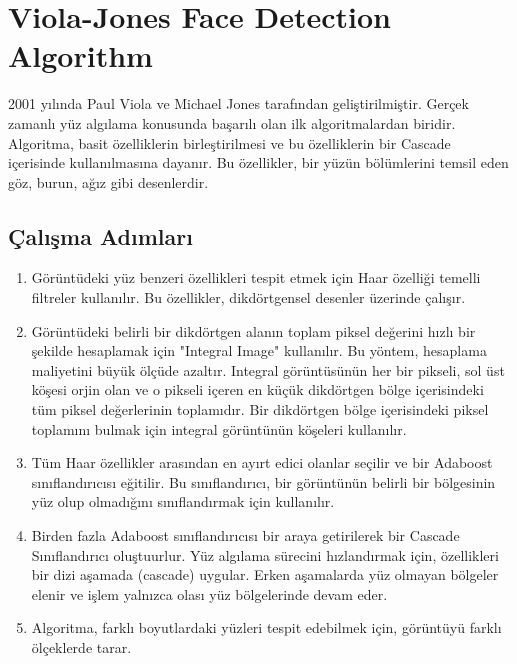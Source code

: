 \section{Viola-Jones Face Detection Algorithm}

2001 yılında Paul Viola ve Michael Jones tarafından geliştirilmiştir. Gerçek zamanlı yüz algılama konusunda başarılı olan ilk algoritmalardan biridir. Algoritma, basit özelliklerin birleştirilmesi ve bu özelliklerin bir Cascade içerisinde kullanılmasına dayanır. Bu özellikler, bir yüzün bölümlerini temsil eden göz, burun, ağız gibi desenlerdir.

\subsection{Çalışma Adımları}

\begin{enumerate}
    \item Görüntüdeki yüz benzeri özellikleri tespit etmek için Haar özelliği temelli filtreler kullanılır. Bu özellikler, dikdörtgensel desenler üzerinde çalışır.
    \item Görüntüdeki belirli bir dikdörtgen alanın toplam piksel değerini hızlı bir şekilde hesaplamak için "Integral Image" kullanılır. Bu yöntem, hesaplama maliyetini büyük ölçüde azaltır. Integral görüntüsünün her bir pikseli, sol üst köşesi orjin olan ve o pikseli içeren en küçük dikdörtgen bölge içerisindeki tüm piksel değerlerinin toplamıdır. Bir dikdörtgen bölge içerisindeki piksel toplamını bulmak için integral görüntünün köşeleri kullanılır.
    \item Tüm Haar özellikler arasından en ayırt edici olanlar seçilir ve bir Adaboost sınıflandırıcısı eğitilir. Bu sınıflandırıcı, bir görüntünün belirli bir bölgesinin yüz olup olmadığını sınıflandırmak için kullanılır. 
    \item Birden fazla Adaboost sınıflandırıcısı bir araya getirilerek bir Cascade Sınıflandırıcı oluştuurlur. Yüz algılama sürecini hızlandırmak için, özellikleri bir dizi aşamada (cascade) uygular. Erken aşamalarda yüz olmayan bölgeler elenir ve işlem yalnızca olası yüz bölgelerinde devam eder.
    \item Algoritma, farklı boyutlardaki yüzleri tespit edebilmek için, görüntüyü farklı ölçeklerde tarar.
\end{enumerate}

\newpage